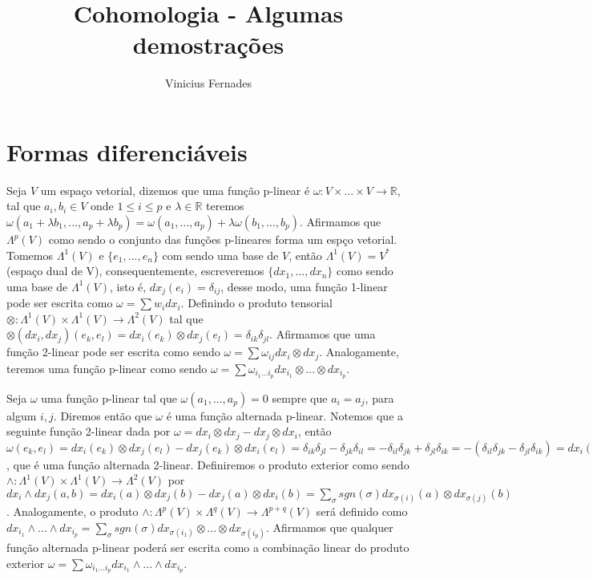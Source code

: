 \documentclass{article}
\begin{document}
	
	\title{Cohomologia - Algumas demostrações}
	\author{Vinicius Fernades}
	
	\maketitle
	
	\section{Formas diferenciáveis}
	Seja $V$ um espaço vetorial, dizemos que uma função p-linear é $\omega : V \times \dots \times V \to \mathbb{R}$, tal que $a_{i}, b_{i} \in V$ onde $1\leq i \leq p$ e $\lambda \in \mathbb{R}$ teremos $\omega(a_{1} + \lambda b_{1}, ..., a_{p} + \lambda b_{p}) = \omega(a_{1} , ..., a_{p} )+ \lambda \omega(b_{1}, ..., b_{p})$. Afirmamos que $\Lambda^{p}(V)$ como sendo o conjunto das funções p-lineares forma um espço vetorial. Tomemos $\Lambda^{1}(V)$ e $\{e_{1}, ..., e_{n}\}$ com sendo uma base de $V$, então $\Lambda^{1}(V) = V^{*}$ (espaço dual de V), consequentemente, escreveremos $\{dx_{1}, ..., dx_{n}\}$ como sendo uma base de $\Lambda^{1}(V)$, isto é, $dx_{j}(e_{i}) = \delta_{ij}$, desse modo, uma função 1-linear pode ser escrita como $\omega = \sum w_{i}dx_{i}$. Definindo o produto tensorial $\otimes: \Lambda^{1}(V) \times \Lambda^{1}(V) \to \Lambda^{2}(V)$ tal que $\otimes(dx_{i}, dx_{j})(e_{k}, e_{l}) = dx_{i}(e_{k}) \otimes dx_{j}(e_{l}) = \delta_{ik}\delta_{jl}$. Afirmamos que uma função 2-linear pode ser escrita como sendo $\omega = \sum \omega_{ij}dx_{i} \otimes dx_{j}$. Analogamente, teremos uma função p-linear como sendo  $\omega = \sum \omega_{i_{1}...i_{p}}dx_{i_{1}} \otimes ... \otimes dx_{i_{p}}$.
	
	Seja $\omega$ uma função p-linear tal que $\omega(a_{1}, ..., a_{p}) = 0 $ sempre que $a_{i} = a_{j}$, para algum $i, j$. Diremos então que $\omega$ é uma função alternada p-linear. Notemos que a seguinte função 2-linear dada por $\omega = dx_{i} \otimes dx_{j} - dx_{j} \otimes dx_{i}$, então $\omega(e_{k},e_{l}) = dx_{i}(e_{k}) \otimes dx_{j}(e_{l}) - dx_{j}(e_{k}) \otimes dx_{i}(e_{l}) = \delta_{ik}\delta_{jl} - \delta_{jk}\delta_{il} =  -\delta_{il}\delta_{jk} + \delta_{jl}\delta_{ik}= -(\delta_{il}\delta_{jk} - \delta_{jl}\delta_{ik}) = dx_{i}(e_{l}) \otimes dx_{j}(e_{k}) - dx_{j}(e_{l}) \otimes dx_{i}(e_{k}) = -\omega(e_{l}, e_{k})$, que é uma função alternada 2-linear. Definiremos o produto exterior como sendo $\wedge: \Lambda^{1}(V) \times \Lambda^{1}(V) \to \Lambda^{2}(V)$ por $ dx_{i} \wedge dx_{j}(a, b) = dx_{i}(a) \otimes dx_{j}(b) - dx_{j}(a) \otimes dx_{i}(b) = \sum_{\sigma} sgn(\sigma) dx_{\sigma(i)}(a) \otimes dx_{\sigma(j)}(b)$. Analogamente, o produto $\wedge: \Lambda^{p}(V) \times \Lambda^{q}(V) \to \Lambda^{p+q}(V)$ será definido como $dx_{i_{1}} \wedge ... \wedge dx_{i_{p}} = \sum_{\sigma}  sgn(\sigma) dx_{\sigma (i_{1})} \otimes ... \otimes dx_{\sigma (i_{p})}$. Afirmamos que qualquer função alternada p-linear poderá ser escrita como a combinação linear do produto exterior $\omega = \sum \omega_{i_{1}...i_{p}} dx_{i_{1}} \wedge... \wedge dx_{i_{p}}$.
	
\end{document}

